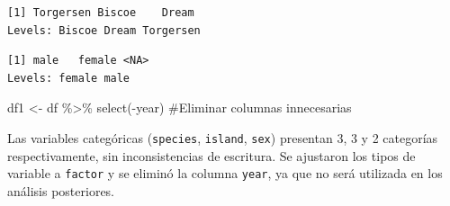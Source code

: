 \documentclass[
  spanish,
  11pt,
  a4paper,
  DIV=11,
  numbers=noendperiod]{scrartcl}
\newenvironment{Shaded}{\begin{snugshade}}{\end{snugshade}}
\newcommand{\CommentTok}[1]{\textcolor[rgb]{0.37,0.37,0.37}{#1}}
\newcommand{\FunctionTok}[1]{\textcolor[rgb]{0.28,0.35,0.67}{#1}}
\newcommand{\NormalTok}[1]{\textcolor[rgb]{0.00,0.23,0.31}{#1}}
\newcommand{\OtherTok}[1]{\textcolor[rgb]{0.00,0.23,0.31}{#1}}
\newcommand{\SpecialCharTok}[1]{\textcolor[rgb]{0.37,0.37,0.37}{#1}}
\begin{document}
\begin{verbatim}
[1] Torgersen Biscoe    Dream    
Levels: Biscoe Dream Torgersen
\end{verbatim}

\begin{Shaded}
\end{Shaded}

\begin{verbatim}
[1] male   female <NA>  
Levels: female male
\end{verbatim}

\begin{Shaded}
\begin{Highlighting}[numbers=left,,]
\NormalTok{df1 }\OtherTok{\textless{}{-}}\NormalTok{ df }\SpecialCharTok{\%\textgreater{}\%} \FunctionTok{select}\NormalTok{(}\SpecialCharTok{{-}}\NormalTok{year) }\CommentTok{\#Eliminar columnas innecesarias}
\end{Highlighting}
\end{Shaded}

Las variables categóricas (\texttt{species}, \texttt{island},
\texttt{sex}) presentan 3, 3 y 2 categorías respectivamente, sin
inconsistencias de escritura. Se ajustaron los tipos de variable a
\texttt{factor} y se eliminó la columna \texttt{year}, ya que no será
utilizada en los análisis posteriores.
\end{document}

